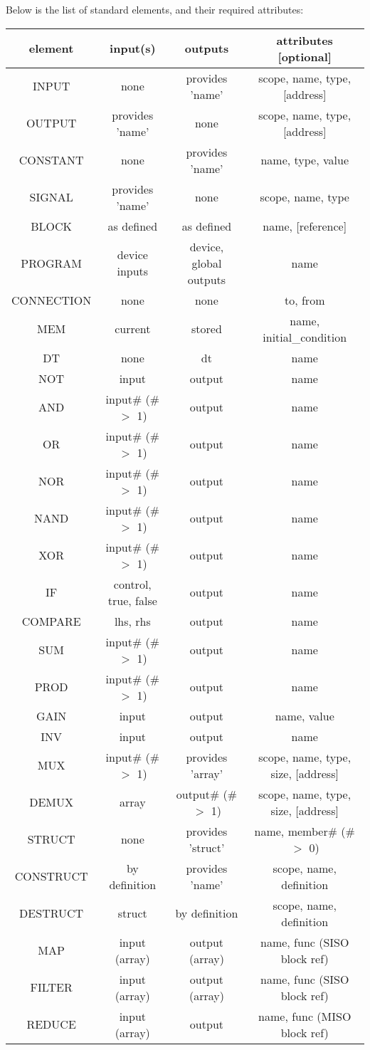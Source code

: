 \documentclass[dvips,12pt]{article}
\begin{document}
Below is the list of standard elements, and their required attributes:
\begin{longtable}[c]{ |c|c|c|c| } 
    \hline
    element & input(s) & outputs & attributes [optional]  \\ 
    \hline\hline
    INPUT & none & provides 'name' & scope, name, type, [address] \\ 
    OUTPUT & provides 'name' & none & scope, name, type, [address] \\ 
    CONSTANT & none & provides 'name' & name, type, value \\ 
    SIGNAL & provides 'name' & none & scope, name, type \\ 
    \hline
    BLOCK & as defined & as defined & name, [reference] \\ 
    PROGRAM & device inputs & device, global outputs & name \\ 
    CONNECTION & none & none & to, from \\
    \hline
    MEM & current & stored & name, initial\_condition \\
    DT & none & dt & name \\
    NOT & input & output & name \\
    AND & input\# (\# $>$ 1) & output & name \\
    OR & input\# (\# $>$ 1) & output & name \\
    NOR & input\# (\# $>$ 1) & output & name \\
    NAND & input\# (\# $>$ 1) & output & name \\
    XOR & input\# (\# $>$ 1) & output & name \\
    IF & control, true, false & output & name \\
    COMPARE & lhs, rhs  & output & name \\
    SUM & input\# (\# $>$ 1) & output & name \\
    PROD & input\# (\# $>$ 1) & output & name \\
    GAIN & input & output & name, value \\
    INV & input & output & name \\
    \hline
    MUX & input\# (\# $>$ 1) & provides 'array' & scope, name, type, size, [address] \\
    DEMUX & array & output\# (\# $>$ 1) & scope, name, type, size, [address] \\
    STRUCT & none & provides 'struct' & name, member\# (\# $>$ 0) \\
    CONSTRUCT & by definition & provides 'name' & scope, name, definition \\
    DESTRUCT & struct & by definition & scope, name, definition \\
    \hline
    MAP & input (array) & output (array) & name, func (SISO block ref) \\
    FILTER & input (array) & output (array) & name, func (SISO block ref)\\
    REDUCE & input (array) & output & name, func (MISO block ref) \\
    \hline
\end{longtable}
\end{document}
